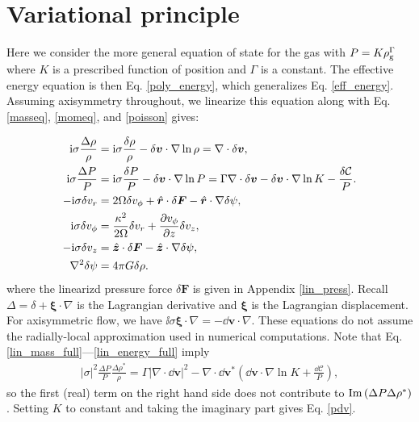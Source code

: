 \section{Variational principle}\label{var_prin}

Here we consider the more general equation of state for the gas with
$P = K \rho_\mathrm{g}^{\Gamma}$ where $K$ is a prescribed function of position
and $\Gamma$ is a constant. The effective energy equation is then
Eq. \ref{poly_energy}, which generalizes
Eq. \ref{eff_energy}. Assuming axisymmetry throughout, we linearize this equation along with Eq. \ref{masseq},  
\ref{momeq},  and \ref{poisson} gives:  


\begin{align}
 \mathrm{i}\sigma\frac{\Delta\rho}{\rho} &= \mathrm{i}\sigma\frac{\delta\rho}{\rho} - 
  \delta\bm{v}\cdot\nabla\ln{\rho} =  \nabla\cdot\delta\bm{v},\label{lin_mass_full}\\
  \mathrm{i}\sigma\frac{\Delta P}{P} &= \mathrm{i}\sigma\frac{\delta P}{P} -
  \delta\bm{v}\cdot\nabla\ln{P} = 
\Gamma \nabla\cdot\delta\bm{v}  - \delta\bm{v}\cdot\nabla\ln{K} - \frac{\delta\mathcal{C}}{P}.\label{lin_energy_full}\\
  -\mathrm{i}\sigma\delta v_r  &= 2\Omega\delta v_\phi + 
  \hat{\bm{r}} \cdot \delta\bm{F} -  \hat{\bm{r}} \cdot \nabla\delta\psi ,\\
  \mathrm{i}\sigma\delta v_\phi &= \frac{\kappa^2}{2\Omega}\delta v_r + \frac{\partial
    v_\phi}{\partial z}\delta v_z,\\
  -\mathrm{i}\sigma\delta v_z &=  \hat{\bm{z}} \cdot \delta\bm{F}  -  \hat{\bm{z}} \cdot \nabla\delta\psi, \\ 
\nabla^2 \delta\psi & = 4\pi G \delta\rho. 
\end{align}  
where the linearizd pressure force $\delta \bm{F}$ is given in
Appendix \ref{lin_press}. Recall $\Delta = \delta +
\bm{\xi}\cdot\nabla$ is the Lagrangian derivative and $\bm{\xi}$ is the
Lagrangian displacement. For axisymmetric flow, we have
$\ii\sigma\bm{\xi}\cdot\nabla = -\dd\bm{v}\cdot\nabla$.  These equations do not assume the
radially-local approximation used in numerical computations. Note that
Eq. \ref{lin_mass_full}---\ref{lin_energy_full} imply 
\begin{align}
\left|\sigma\right|^2\frac{\Delta P}{P}\frac{\Delta \rho^*}{\rho} =
\Gamma\left|\nabla\cdot\dd\bm{v}\right|^2 -
\nabla\cdot\dd\bm{v}^*\left(\dd\bm{v}\cdot\nabla\ln{K} + \frac{\dd\mathcal{C}}{P}\right),
\end{align}
so the first (real) term on the right hand side does not contribute to
$\operatorname{Im}{\left(\Delta P\Delta\rho^*\right)}$. Setting $K$ to constant
and taking the imaginary part gives Eq. \ref{pdv}. 

